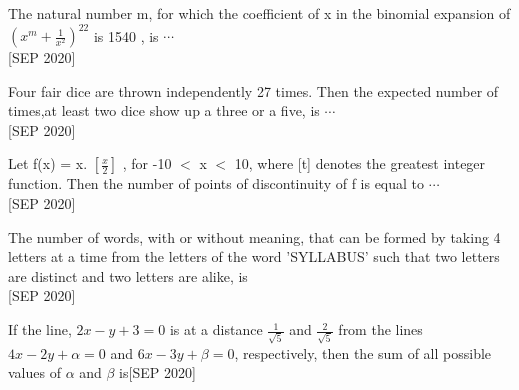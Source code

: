\iffalse
  \title{Assignment}
  \author{ee24btech11030}
  \section{integer}
\fi

\item The natural number m, for which the coefficient of x in the binomial expansion of ${\left(x^m + \frac{1}{x^2}\right)}^{22}$ is 1540 , is $\cdots$ \\\hfill{[SEP 2020]}
    \item Four fair dice are thrown independently 27 times. Then the expected number of times,at least two dice show up a three or a five, is $\cdots$ \\\hfill{[SEP 2020]}
    \item Let f(x) = x. $\left[\frac{x}{2}\right]$ , for -10 $<$ x $<$ 10, where [t] denotes the greatest integer function. Then the number of points of discontinuity of f is equal to $\cdots$ \\\hfill{[SEP 2020]}
    \item The number of words, with or without meaning, that can be formed by taking 4 letters at a time from the letters of the word 'SYLLABUS' such that two letters are distinct and two letters are alike, is \\\hfill{[SEP 2020]}
    \item If the line, $2x-y+3=0$ is at a distance $\frac{1}{\sqrt{5}}$ and $\frac{2}{\sqrt{5}}$ from the lines $4x - 2y + \alpha =0$ and $6x - 3y + \beta =0$, respectively, then the sum of all possible values of $\alpha$ and $\beta$ is\hfill{[SEP 2020]}
